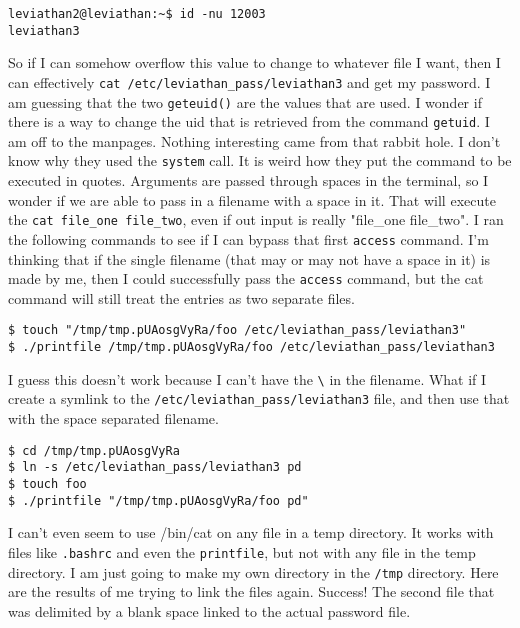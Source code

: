 \documentclass[11pt]{article}
\begin{document}
\begin{lstlisting}
leviathan2@leviathan:~$ id -nu 12003
leviathan3
\end{lstlisting}

So if I can somehow overflow this value to change to whatever file I want, then I can effectively \verb|cat /etc/leviathan_pass/leviathan3| and get my password. I am guessing that the two \verb|geteuid()| are the values that are used. I wonder if there is a way to change the uid that is retrieved from the command \verb|getuid|. I am off to the manpages. Nothing interesting came from that rabbit hole. 
I don't know why they used the \verb|system| call. It is weird how they put the command to be executed in quotes. Arguments are passed through spaces in the terminal, so I wonder if we are able to pass in a filename with a space in it. That will execute the \verb|cat file_one file_two|, even if out input is really "file\_one file\_two". I ran the following commands to see if I can bypass that first \verb|access| command. I'm thinking that if the single filename (that may or may not have a space in it) is made by me, then I could successfully pass the \verb|access| command, but the cat command will still treat the entries as two separate files.

\begin{lstlisting} 
$ touch "/tmp/tmp.pUAosgVyRa/foo /etc/leviathan_pass/leviathan3"
$ ./printfile /tmp/tmp.pUAosgVyRa/foo /etc/leviathan_pass/leviathan3
\end{lstlisting}

I guess this doesn't work because I can't have the \verb|\| in the filename. What if I create a symlink to the \verb|/etc/leviathan_pass/leviathan3| file, and then use that with the space separated filename. 

\begin{lstlisting} 
$ cd /tmp/tmp.pUAosgVyRa
$ ln -s /etc/leviathan_pass/leviathan3 pd 
$ touch foo
$ ./printfile "/tmp/tmp.pUAosgVyRa/foo pd"
\end{lstlisting}

I can't even seem to use /bin/cat on any file in a temp directory. It works with files like \verb|.bashrc| and even the \verb|printfile|, but not with any file in the temp directory. I am just going to make my own directory in the \verb|/tmp| directory. Here are the results of me trying to link the files again. Success! The second file that was delimited by a blank space linked to the actual password file.
\end{document}
